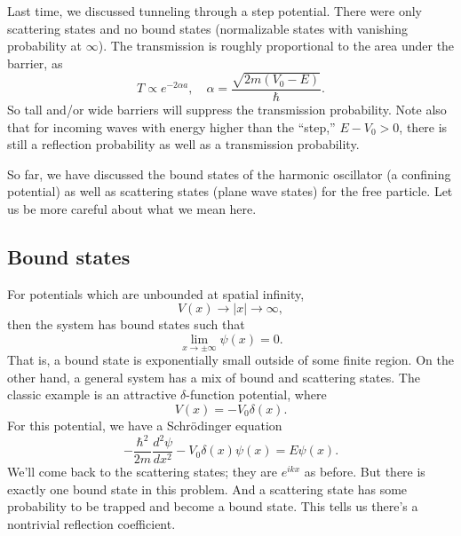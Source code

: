 Last time, we discussed tunneling through a step potential. There were only scattering states and no bound states (normalizable states with vanishing probability at $\infty$). The transmission is roughly proportional to the area under the barrier, as
\begin{equation}
    T\propto e^{-2\alpha a}, \quad \alpha =\frac{\sqrt{2m(V_0-E)}}{\hbar}.
\end{equation}
So tall and/or wide barriers will suppress the transmission probability. Note also that for incoming waves with energy higher than the ``step,'' $E-V_0>0$, there is still a reflection probability as well as a transmission probability.

So far, we have discussed the bound states of the harmonic oscillator (a confining potential) as well as scattering states (plane wave states) for the free particle. Let us be more careful about what we mean here.

\subsection*{Bound states}
For potentials which are unbounded at spatial infinity,
\begin{equation}
    V(x)\to |x|\to \infty,
\end{equation}
then the system has bound states such that
\begin{equation}
    \lim_{x\to \pm\infty} \psi(x)=0.
\end{equation}
That is, a bound state is exponentially small outside of some finite region.
On the other hand, a general system has a mix of bound and scattering states. The classic example is an attractive $\delta$-function potential, where
\begin{equation}
    V(x) = -V_0 \delta(x).
\end{equation}
For this potential, we have a Schr\"odinger equation
\begin{equation}
    -\frac{\hbar^2}{2m}\frac{d^2\psi}{dx^2} - V_0 \delta(x) \psi(x) = E\psi(x).
\end{equation}
We'll come back to the scattering states; they are $e^{ikx}$ as before. But there is exactly one bound state in this problem. And a scattering state has some probability to be trapped and become a bound state. This tells us there's a nontrivial reflection coefficient.

